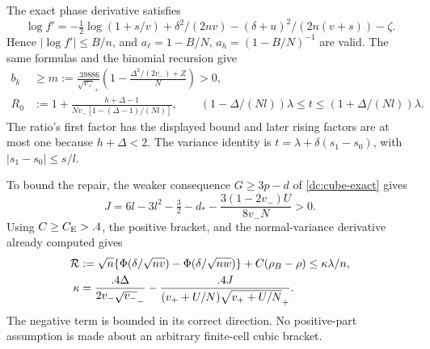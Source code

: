 The exact phase derivative satisfies
\[
 \log f'=-\tfrac12\log(1+s/v)+\delta^2/(2nv)
                    -(\delta+u)^2/(2n(v+s))-\zeta.
\]
Hence $|\log f'|\le B/n$, and
$a_\ell=1-B/N$, $a_h=(1-B/N)^{-1}$ are valid.
The same formulas and the binomial recursion give
\begin{align*}
 b_k&\ge m:=\frac{.39886}{\sqrt{v_+}_+}
          \left(1-\frac{\Delta^2/(2v_-)+Z}{N}\right)>0,\\
 R_0&:=1+\frac{h+\Delta-1}{Nv_-[1-(\Delta-1)/(Nl)]},\qquad
 (1-\Delta/(Nl))\lambda\le t\le(1+\Delta/(Nl))\lambda.
\end{align*}
The ratio's first factor has the displayed bound and later rising factors
are at most one because $h+\Delta<2$. The variance identity is
$t=\lambda+\delta(s_1-s_0)$, with $|s_1-s_0|\le s/l$.

To bound the repair, the weaker consequence $G\ge3p-d$ of
\eqref{dc:cube-exact} gives
\[
 J=6l-3l^2-\tfrac32-d_*-\frac{3(1-2v_-)U}{8v_-N}>0.
\]
Using $C\ge C_{\mathrm E}>.4$, the positive bracket, and the normal-variance
derivative already computed gives
\begin{align}\label{dc:tail-repair}
 \mathcal R&:=\sqrt n\{\Phi(\delta/\sqrt{nv})-\Phi(\delta/\sqrt{nw})\}
                      +C(\rho_B-\rho)\le\kappa\lambda/n,\\
 \kappa&=\frac{.4\Delta}{2v_-\sqrt{v_-}_-}
                       -\frac{.4J}{(v_++U/N)\sqrt{v_++U/N}_+}.\notag
\end{align}
The negative term is bounded in its correct direction. No positive-part
assumption is made about an arbitrary finite-cell cubic bracket.


